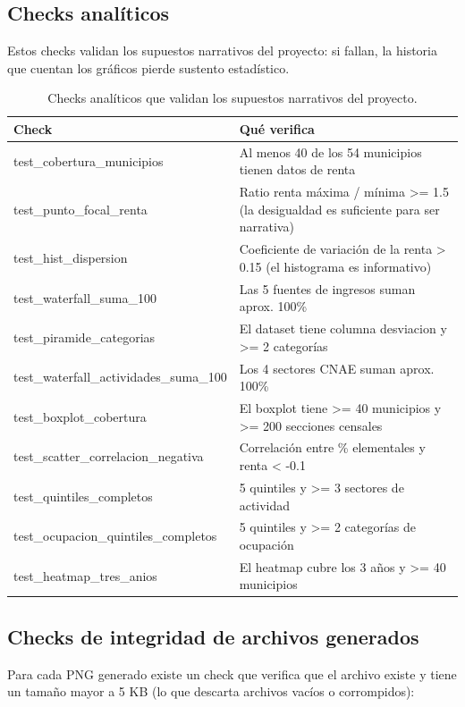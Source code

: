 \documentclass[spanish,a4paper,12pt,oneside]{extreport}
\begin{document}
\subsection{Checks analíticos}

Estos checks validan los supuestos narrativos del proyecto: si fallan, la historia que cuentan los gráficos pierde sustento estadístico.

\begin{table}[H]
\centering
\small
\begin{tabular}{lp{7.5cm}}
\toprule
Check & Qué verifica \\
\midrule
test\_cobertura\_municipios & Al menos 40 de los 54 municipios tienen datos de renta \\
test\_punto\_focal\_renta & Ratio renta máxima / mínima >= 1.5 (la desigualdad es suficiente para ser narrativa) \\
test\_hist\_dispersion & Coeficiente de variación de la renta > 0.15 (el histograma es informativo) \\
test\_waterfall\_suma\_100 & Las 5 fuentes de ingresos suman aprox. 100\% \\
test\_piramide\_categorias & El dataset tiene columna desviacion y >= 2 categorías \\
test\_waterfall\_actividades\_suma\_100 & Los 4 sectores CNAE suman aprox. 100\% \\
test\_boxplot\_cobertura & El boxplot tiene >= 40 municipios y >= 200 secciones censales \\
test\_scatter\_correlacion\_negativa & Correlación entre \% elementales y renta < -0.1 \\
test\_quintiles\_completos & 5 quintiles y >= 3 sectores de actividad \\
test\_ocupacion\_quintiles\_completos & 5 quintiles y >= 2 categorías de ocupación \\
test\_heatmap\_tres\_anios & El heatmap cubre los 3 años y >= 40 municipios \\
\bottomrule
\end{tabular}
\caption{Checks analíticos que validan los supuestos narrativos del proyecto.}
\end{table}

\subsection{Checks de integridad de archivos generados}

Para cada PNG generado existe un check que verifica que el archivo existe y tiene un tamaño mayor a 5 KB (lo que descarta archivos vacíos o corrompidos):
\end{document}
